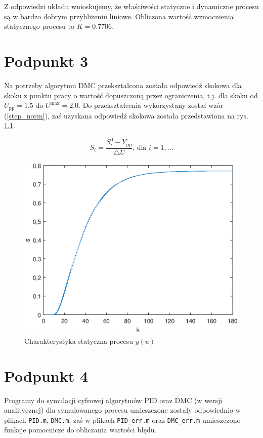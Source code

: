 Z odpowiedzi układu wnioskujemy, że właściwości statyczne i dynamiczne procesu są w bardzo dobrym przybliżeniu liniowe. Obliczona wartość wzmocnienia statycznego procesu to $K=\num{0,7706}$.


\chapter{Podpunkt 3}
Na potrzeby algorytmu DMC przekształcona została odpowiedź skokowa dla skoku z punktu pracy o wartość dopuszczoną przez ograniczenia, t.j. dla skoku od $U_{\mathrm{pp}}=\num{1,5}$ do $U^{\mathrm{max}}=\num{2,0}$. Do przekształcenia wykorzystany został wzór (\ref{step_norm}), zaś uzyskana odpowiedź skokowa została przedstawiona na rys. \ref{Z3step}.

\begin{equation}
S_i = \frac{S_i^0 - Y_{\mathrm{pp}}}{\triangle U} \textrm{, dla } i=1,\ldots
\label{step_norm}
\end{equation}


\begin{figure}[ht]
\centering
\includegraphics[scale=1]{images/Z3step}
\caption{Charakterystyka statyczna procesu $y(u)$}
\label{Z3step}
\end{figure}


\chapter{Podpunkt 4}
Programy do symulacji cyfrowej algorytmów PID oraz DMC (w wersji analitycznej) dla symulowanego procesu umieszczone zostały odpowiednio w plikach \verb+PID.m+, \verb+DMC.m+, zaś w plikach \verb+PID_err.m+ oraz \verb+DMC_err.m+ umieszczono funkcje pomocnicze do obliczania wartości błędu.

